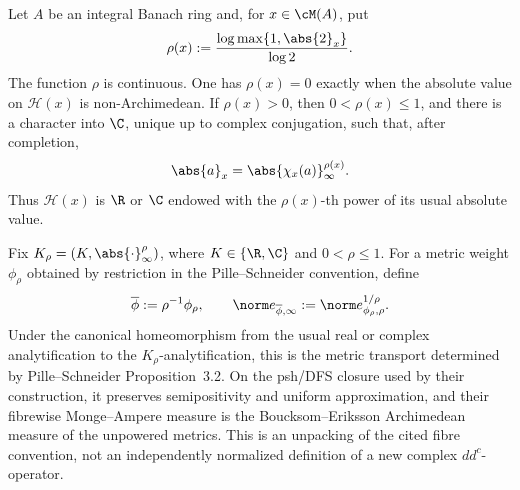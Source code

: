 
\begin{lemma}
\label{lem:p171-production-rho-convention}
Let \(A\) be an integral Banach ring and, for \(x\in\cM(A)\), put
\begin{equation}
 \rho(x):=\frac{\log\max\{1,\abs{2}_x\}}{\log 2}.
 \label{eq:p171-production-rho}
\end{equation}
The function \(\rho\) is continuous.  One has \(\rho(x)=0\) exactly when
the absolute value on \(\mathcal H(x)\) is non-Archimedean.  If
\(\rho(x)>0\), then \(0<\rho(x)\leq1\), and there is a character into
\(\C\), unique up to complex conjugation, such that, after completion,
\begin{equation}
 \abs{a}_x=\abs{\chi_x(a)}_\infty^{\rho(x)}.
 \label{eq:p171-production-character}
\end{equation}
Thus \(\mathcal H(x)\) is \(\R\) or \(\C\) endowed with the
\(\rho(x)\)-th power of its usual absolute value.

Fix \(K_\rho=(K,\abs{\cdot}_\infty^\rho)\), where
\(K\in\{\R,\C\}\) and \(0<\rho\leq1\).  For a metric weight
\(\phi_\rho\) obtained by restriction in the Pille--Schneider convention,
define
\begin{equation}
 \overline\phi:=\rho^{-1}\phi_\rho,
 \qquad
 \norm e_{\overline\phi,\infty}
 :=\norm e_{\phi_\rho,\rho}^{1/\rho}.
 \label{eq:p171-production-unpower}
\end{equation}
Under the canonical homeomorphism from the usual real or complex
analytification to the \(K_\rho\)-analytification, this is the metric
transport determined by Pille--Schneider Proposition~3.2.  On the
psh/DFS closure used by their construction, it preserves semipositivity and
uniform approximation, and their fibrewise Monge--Ampere measure is the
Boucksom--Eriksson Archimedean measure of the unpowered metrics.  This is an
unpacking of the cited fibre convention, not an independently normalized
definition of a new complex \(dd^c\)-operator.
\end{lemma}

